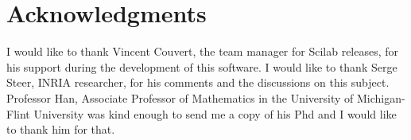 \chapter{Acknowledgments}

I would like to thank Vincent Couvert, 
the team manager for Scilab releases, for his support 
during the development of this software. I would like to thank 
Serge Steer, INRIA researcher, for his comments and the discussions 
on this subject. Professor Han, Associate Professor of Mathematics in the 
University of Michigan-Flint University was kind enough to send me a copy
of his Phd and I would like to thank him for that.


